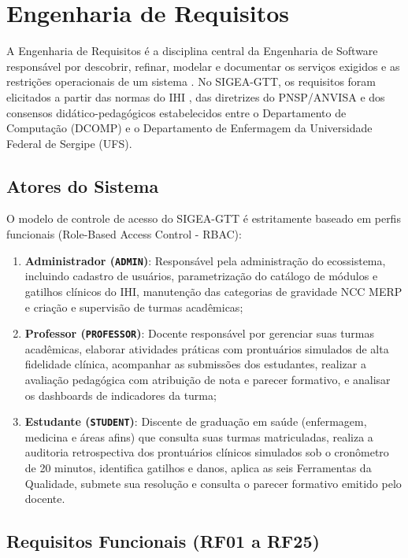 \chapter{Engenharia de Requisitos}
\label{cap_requisitos}

A Engenharia de Requisitos é a disciplina central da Engenharia de Software responsável por descobrir, refinar, modelar e documentar os serviços exigidos e as restrições operacionais de um sistema \cite{sommerville2019}. No SIGEA-GTT, os requisitos foram elicitados a partir das normas do IHI \cite{griffin2009ihi}, das diretrizes do PNSP/ANVISA \cite{anvisa2017} e dos consensos didático-pedagógicos estabelecidos entre o Departamento de Computação (DCOMP) e o Departamento de Enfermagem da Universidade Federal de Sergipe (UFS).

\section{Atores do Sistema}
\label{sec_atores}

O modelo de controle de acesso do SIGEA-GTT é estritamente baseado em perfis funcionais (Role-Based Access Control - RBAC):
\begin{enumerate}
    \item \textbf{Administrador (\texttt{ADMIN})}: Responsável pela administração do ecossistema, incluindo cadastro de usuários, parametrização do catálogo de módulos e gatilhos clínicos do IHI, manutenção das categorias de gravidade NCC MERP e criação e supervisão de turmas acadêmicas;
    \item \textbf{Professor (\texttt{PROFESSOR})}: Docente responsável por gerenciar suas turmas acadêmicas, elaborar atividades práticas com prontuários simulados de alta fidelidade clínica, acompanhar as submissões dos estudantes, realizar a avaliação pedagógica com atribuição de nota e parecer formativo, e analisar os dashboards de indicadores da turma;
    \item \textbf{Estudante (\texttt{STUDENT})}: Discente de graduação em saúde (enfermagem, medicina e áreas afins) que consulta suas turmas matriculadas, realiza a auditoria retrospectiva dos prontuários clínicos simulados sob o cronômetro de 20 minutos, identifica gatilhos e danos, aplica as seis Ferramentas da Qualidade, submete sua resolução e consulta o parecer formativo emitido pelo docente.
\end{enumerate}

\section{Requisitos Funcionais (RF01 a RF25)}
\label{sec_requisitos_funcionais}

